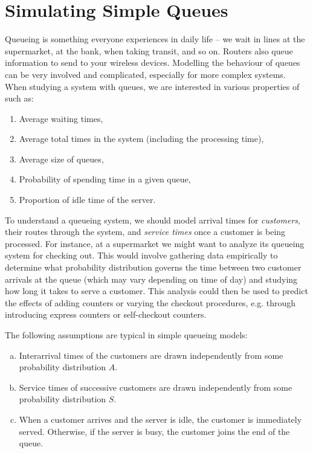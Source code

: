 \section{Simulating Simple Queues}

Queueing is something everyone experiences in daily life -- we wait in lines at the supermarket, at the bank, when taking transit, and so on.
Routers also queue information to send to your wireless devices.
Modelling the behaviour of queues can be very involved and complicated, especially for more complex systems.
When studying a system with queues, we are interested in various properties of such as:

\begin{enumerate}[(1)]
	\item Average waiting times,
	\item Average total times in the system (including the processing time),
	\item Average size of queues,
	\item Probability of spending time in a given queue,
	\item Proportion of idle time of the server.
\end{enumerate}


To understand a queueing system, we should model arrival times for \emph{customers}, their routes through the system, and \emph{service times} once a customer is being processed.
For instance, at a supermarket we might want to analyze its queueing system for checking out.
This would involve gathering data empirically to determine what probability distribution governs the time between two customer arrivals at the queue (which may vary depending on time of day) and studying how long it takes to serve a customer.
This analysis could then be used to predict the effects of adding counters or varying the checkout procedures, e.g. through introducing express counters or self-checkout counters.

The following assumptions are typical in simple queueing models:
\begin{enumerate}[(a)]
	\item Interarrival times of the customers are drawn independently from some probability distribution $A$.
	\item Service times of successive customers are drawn independently from some probability distribution $S$.
	\item When a customer arrives and the server is idle, the customer is immediately served.
		Otherwise, if the server is busy, the customer joins the end of the queue.
\end{enumerate}

